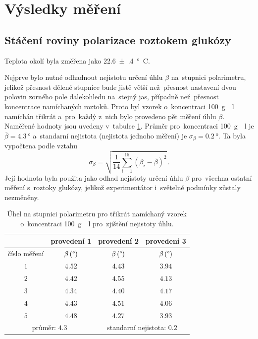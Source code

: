 \documentclass{../concepts/titul_protokol_p/prepareprotokol} %
\begin{document}
\section{Výsledky měření}

\subsection{Stáčení roviny polarizace roztokem glukózy}

Teplota okolí byla změřena jako \qty{22.6(4)}{\degree C}.

Nejprve bylo nutné odhadnout nejistotu určení úhlu $\beta$ na~stupnici polarimetru, jelikož přesnost dělené
stupnice bude jistě větší než~přesnost nastavení dvou polovin zorného pole dalekohledu na~stejný jas, případně
než~přesnost koncentrace namíchaných roztoků. Proto byl vzorek o~koncentraci \qty{100}{g \per l} namíchán třikrát
a~pro~každý z~nich bylo provedeno pět měření úhlu $\beta$. Naměřené hodnoty jsou uvedeny v~tabulce 
\ref{tab:glukoza_nejistota}. Průměr pro~koncentraci \qty{100}{g \per l} je $\overline{\beta} = \qty{4.3}{\degree}$ 
a~standarní nejistota (nejistota jednoho měření) je $\sigma_{\beta} = \qty{0.2}{\degree}$. Ta byla 
vypočtena podle vztahu \cite{englich}
\begin{equation}
    \label{eq:sigma_beta_glukoza}
    \sigma_{\beta} = \sqrt{ \frac{1}{14} \sum_{i=1}^{15} \left( \beta_i - \overline{\beta} \right)^2 } \,.
\end{equation}
Její hodnota byla použita jako odhad nejistoty určení úhlu $\beta$ pro~všechna ostatní měření s~roztoky glukózy,
jelikož experimentátor i~světelné podmínky zůstaly nezměněny.

\begin{table}[!htbp]
\centering
\caption{Úhel na stupnici polarimetru pro třikrát namíchaný vzorek o~koncentraci 
\qty{100}{g \per l} pro~zjištění nejistoty úhlu.}
\begin{tabular}{c|ccc}
 \toprule
  & provedení 1 & provedení 2 & provedení 3 \\
 \midrule
 číslo měření & $\beta\, (\mathrm{\degree})$ & $\beta\, (\mathrm{\degree})$ & $\beta\, (\mathrm{\degree})$ \\
 \midrule
 $1$ & $4.52$ & $4.43$ & $3.94$ \\
 $2$ & $4.42$ & $4.55$ & $4.13$ \\
 $3$ & $4.34$ & $4.40$ & $4.17$ \\
 $4$ & $4.43$ & $4.51$ & $4.06$ \\
 $5$ & $4.48$ & $4.27$ & $3.93$ \\
 \midrule
 \midrule
 \multicolumn{2}{c}{průměr: $4.3$} \vline & \multicolumn{2}{c}{standarní nejistota: $0.2$} \\
 \bottomrule
\end{tabular}
\label{tab:glukoza_nejistota}
\end{table}
\end{document}
